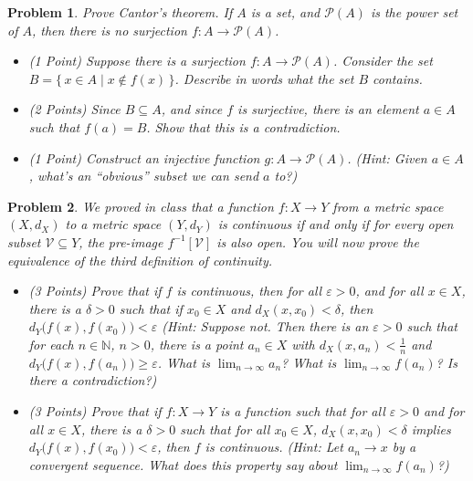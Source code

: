 \documentclass{article}
\theoremstyle{normal}
\newtheorem{problem}{Problem}
\begin{document}
    \begin{problem}
        Prove Cantor's theorem. If $A$ is a set, and $\mathcal{P}(A)$ is the
        power set of $A$, then there is no surjection
        $f:A\rightarrow\mathcal{P}(A)$.
        \begin{itemize}
            \item (1 Point) Suppose there is a surjection
                $f:A\rightarrow\mathcal{P}(A)$. Consider the set
                $B=\{\,x\in{A}\;|\;x\notin{f}(x)\,\}$. Describe in words what
                the set $B$ contains.
            \item (2 Points) Since $B\subseteq{A}$, and since $f$ is surjective,
                there is an element $a\in{A}$ such that $f(a)=B$. Show that
                this is a contradiction.
            \item (1 Point) Construct an injective function
                $g:A\rightarrow\mathcal{P}(A)$. (Hint: Given $a\in{A}$, what's
                an ``obvious'' subset we can send $a$ to?) 
        \end{itemize}
    \end{problem}
    \begin{problem}
        We proved in class that a function
        $f:X\rightarrow{Y}$ from a metric space $(X,d_{X})$ to a metric space
        $(Y,d_{Y})$ is continuous if and only if for every open subset
        $\mathcal{V}\subseteq{Y}$, the pre-image $f^{-1}[\mathcal{V}]$ is also
        open. You will now prove the equivalence of the third definition of
        continuity.
        \begin{itemize}
            \item (3 Points) Prove that if $f$ is continuous, then
                for all $\varepsilon>0$, and for all $x\in{X}$, there is a
                $\delta>0$ such that if $x_{0}\in{X}$ and
                $d_{X}(x,x_{0})<\delta$,
                then $d_{Y}\big(f(x),f(x_{0})\big)<\varepsilon$
                (Hint: Suppose not. Then there is an $\varepsilon>0$ such that
                for each $n\in\mathbb{N}$, $n>0$,
                there is a point $a_{n}\in{X}$ with $d_{X}(x,a_{n})<\frac{1}{n}$
                and $d_{Y}\big(f(x),f(a_{n})\big)\geq\varepsilon$. What is
                $\lim_{n\rightarrow\infty}a_{n}$? What is
                $\lim_{n\rightarrow\infty}f(a_{n})$? Is there a contradiction?)
            \item (3 Points) Prove that if $f:X\rightarrow{Y}$ is a function
                such that for all $\varepsilon>0$ and for all $x\in{X}$, there
                is a $\delta>0$ such that for all $x_{0}\in{X}$,
                $d_{X}(x,x_{0})<\delta$ implies
                $d_{Y}\big(f(x),f(x_{0})\big)<\varepsilon$, then $f$ is
                continuous. (Hint: Let $a_{n}\rightarrow{x}$ by a convergent
                sequence. What does this property say about
                $\lim_{n\rightarrow\infty}f(a_{n})$?)
        \end{itemize}
    \end{problem}
\end{document}
